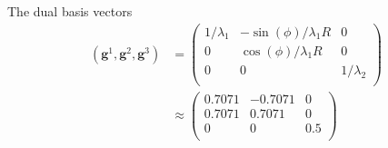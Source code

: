 \documentclass[../main.tex]{subfiles}
\begin{document}
\begin{minipage}[t]{0.5\textwidth}
  The dual basis vectors
  \begin{align*}
    \left(\mathbf{g}^1,\mathbf{g}^2,\mathbf{g}^3\right) &=
                                                          \begin{pmatrix}
                                                            1/\lambda_1 & -\sin(\phi)/\lambda_1R & 0\\
                                                            0 & \cos(\phi)/\lambda_1R & 0\\
                                                            0 & 0 & 1/\lambda_2\\
                                                          \end{pmatrix}\\
                                                        &\approx
                                                          \begin{pmatrix}
                                                            0.7071 & -0.7071 & 0\\
                                                            0.7071 &  0.7071 & 0\\
                                                            0 & 0 & 0.5\\
                                                          \end{pmatrix}
  \end{align*}
\end{minipage}
\end{document}
